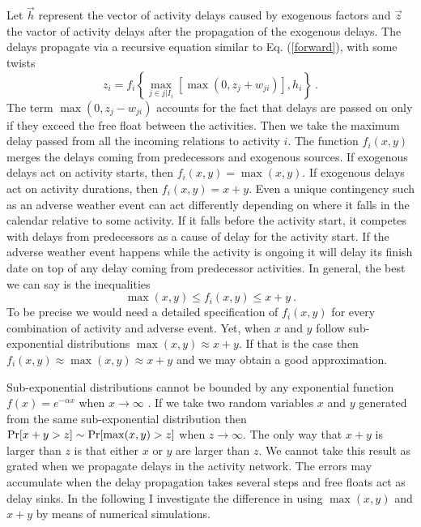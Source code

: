\documentclass[reprint,aps,prl,amsmath,amssymb,superscriptaddress,showpacs]{revtex4-1}
\begin{document}
Let $\vec{h}$ represent the vector of activity delays caused by exogenous factors and $\vec{z}$ the vactor of activity delays after the propagation of the exogenous delays. The delays propagate via a recursive equation similar to Eq. (\ref{forward}), with some twists
\begin{equation}
z_i = f_i\left\{\max_{j\in j|I_i} \left[\max(0,z_j+w_{ji})\right] , h_i\right\}\ .
\label{forward_delay} 
\end{equation}
% 
The term $\max(0,z_j-w_{ji})$ accounts for the fact that delays are passed on only if they exceed the free float between the activities. Then we take the maximum delay passed from all the incoming relations to activity $i$. The function $f_i(x,y)$ merges the delays coming from predecessors and exogenous sources. If exogenous delays act on activity starts, then $f_i(x,y)=\max(x,y)$. If exogenous delays act on activity durations, then $f_i(x,y)=x+y$. Even a unique contingency such as an adverse weather event can act differently depending on where it falls in the calendar relative to some activity. If it falls before the activity start, it competes with delays from predecessors as a cause of delay for the activity start. If the adverse weather event happens while the activity is ongoing it will delay its finish date on top of any delay coming from predecessor activities. In general, the best we can say is the inequalities
%
\begin{equation}
\max(x,y)\leq f_i(x,y)\leq x+y\ .
\label{f_bounds}
\end{equation}
%
To be precise we would need a detailed specification of $f_i(x,y)$ for every combination of activity and adverse event. Yet, when $x$ and $y$ follow sub-exponential distributions $\max(x,y)\approx x+y$. If that is the case then $f_i(x,y)\approx \max(x,y)\approx x+y$ and we may obtain a good approximation. 

Sub-exponential distributions cannot be bounded by any exponential function $f(x) = e^{-\alpha x}$  when $x\rightarrow\infty$ \cite{foss13}. If we take two random variables $x$ and $y$ generated from the same sub-exponential distribution then ${\rm Pr}[x+y>z]\sim {\rm Pr}[\max(x,y)>z]$ when $z\rightarrow\infty$. The only way that $x+y$ is larger than $z$ is that either $x$ or $y$ are larger than $z$. We cannot take this result as grated when we propagate delays in the activity network. The errors may accumulate when the delay propagation takes several steps and free floats act as delay sinks. In the following I investigate the difference in using $\max(x,y)$ and $x+y$ by means of numerical simulations.
\end{document}
